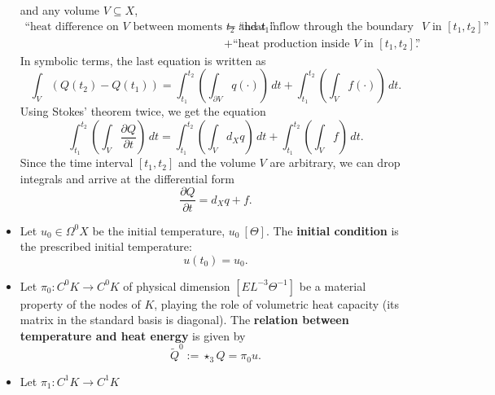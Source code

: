 \begin{discussion}
\begin{itemize}
      and any volume $V \subseteq X$,
      \begin{equation}
        \begin{split}
        \text{``heat difference on $V$ between moments $t_2$ and $t_1$''}
        & =
          \text{``heat inflow through the boundary of $V$ in $[t_1, t_2]$''} \\
        & +
          \text{``heat production inside $V$ in $[t_1, t_2]$''}.
        \end{split}
      \end{equation}
      In symbolic terms, the last equation is written as
      \begin{equation}
        \int_V (Q(t_2) - Q(t_1)) =
          \int_{t_1}^{t_2} \left(\int_{\partial V} q(\cdot) \right)\, d t
        + \int_{t_1}^{t_2} \left(\int_V f(\cdot) \right)\, d t.
      \end{equation}
      Using Stokes' theorem twice, we get the equation
      \begin{equation}
        \int_{t_1}^{t_2}
          \left(\int_V \frac{\partial Q}{\partial t}\right)\, d t =
          \int_{t_1}^{t_2} \left(\int_V d_X q \right)\, d t
        + \int_{t_1}^{t_2} \left(\int_V f \right)\, d t.
      \end{equation}
      Since the time interval $[t_1, t_2]$ and the volume $V$ are arbitrary,
      we can drop integrals and arrive at the differential form
      \begin{equation}
        \frac{\partial Q}{\partial t} = d_X q + f.
      \end{equation}
    \item
      Let
        $u_0 \in \Omega^0 X$ be the initial temperature, $u_0\ [\Theta]$.
      The \textbf{initial condition} is the prescribed initial temperature:
      \begin{equation}
        u(t_0) = u_0.
      \end{equation}
    \item
      Let $\pi_0 \colon C^0 K \to C^0 K$
      of physical dimension $[E L^{-3} \Theta^{-1}]$
      be a material property of the nodes of $K$,
      playing the role of volumetric heat capacity
      (its matrix in the standard basis is diagonal).
      The \textbf{relation between temperature and heat energy} is given by
      \begin{equation}
        \tilde{Q}^0 := \star_3 Q = \pi_0 u.
      \end{equation}
    \item
      Let $\pi_1 \colon C^1 K \to C^1 K$

\end{itemize}
\end{discussion}
